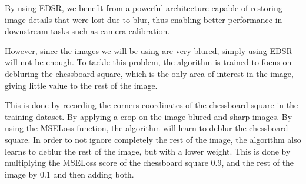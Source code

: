 By using EDSR, we benefit from a powerful architecture capable of restoring image details that were lost due to blur, thus enabling better 
performance in downstream tasks such as camera calibration.

However, since the images we will be using are very blured, simply using EDSR will not be enough. To tackle this problem,
the algorithm is trained to focus on debluring the chessboard square, which is the only area of interest in the image, giving
little value to the rest of the image. 

This is done by recording the corners coordinates of the chessboard square in the training dataset. By applying a crop on the image blured and 
sharp images. By using the MSELoss function, the algorithm will learn to deblur the chessboard square. In order to not ignore completely
the rest of the image, the algorithm also learns to deblur the rest of the image, but with a lower weight. This is done
by multiplying the MSELoss score of the chessboard square 0.9, and the rest of the image by 0.1 and then adding both.